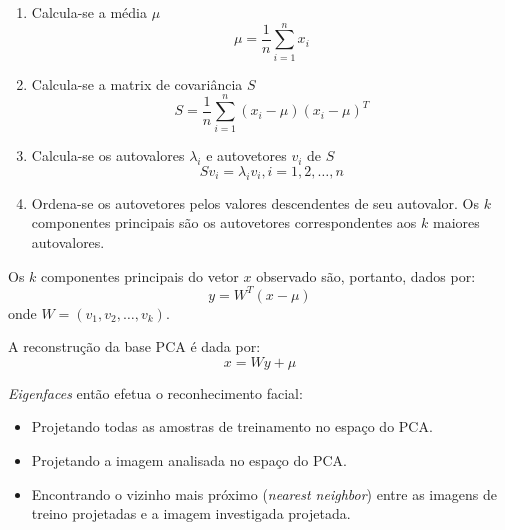 \documentclass[a4paper, 12pt, openright, oneside, english, brazil, article]{abntex2}
\begin{document}
	\begin{enumerate}
		\item Calcula-se a média $\mu$
		$$\mu = \frac{1}{n} \sum_{i=1}^{n}x_i$$
		
		\item Calcula-se a matrix de covariância $S$
		$$S = \frac{1}{n} \sum_{i=1}^{n}(x_i - \mu)(x_i - \mu)^T$$
		
		\item Calcula-se os autovalores $\lambda_i$ e autovetores $v_i$ de $S$
		$$Sv_i = \lambda_iv_i, i=1,2,\ldots,n$$
		
		\item Ordena-se os autovetores pelos valores descendentes de seu autovalor. Os $k$ componentes principais são os autovetores correspondentes aos $k$ maiores autovalores.		
	\end{enumerate}

	Os $k$ componentes principais do vetor $x$ observado são, portanto, dados por:
	$$y = W^T(x-\mu)$$
	onde $W = (v_1, v_2, \ldots, v_k)$. 
	
	A reconstrução da base PCA é dada por:
	$$x = Wy + \mu$$

	\textit{Eigenfaces} então efetua o reconhecimento facial:
	\begin{itemize}
		\item Projetando todas as amostras de treinamento no espaço do PCA.
		\item Projetando a imagem analisada no espaço do PCA.
		\item Encontrando o vizinho mais próximo (\textit{nearest neighbor}) entre as imagens de treino projetadas e a imagem investigada projetada.
	\end{itemize}

	
	
	
	
	\newpage
	
\end{document}
